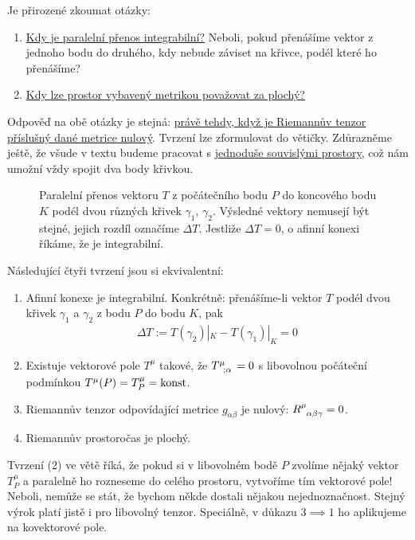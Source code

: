 \documentclass{article}
\begin{document}
Je přirozené zkoumat otázky:
\begin{enumerate}
    \item \underline{Kdy je paralelní přenos integrabilní?} Neboli, pokud přenášíme vektor z jednoho bodu do druhého, kdy nebude záviset na křivce, podél které ho přenášíme?
    \item \underline{Kdy lze prostor vybavený metrikou považovat za plochý?}
\end{enumerate}

Odpověď na obě otázky je stejná: \underline{právě tehdy, když je Riemannův tenzor příslušný dané metrice nulový}. Tvrzení lze zformulovat do větičky. Zdůrazněme ještě, že všude v textu budeme pracovat s \underline{jednoduše souvislými prostory}, což nám umožní vždy spojit dva body křivkou.

\begin{figure}[H] 

\centering
\def\svgwidth{9cm}

\caption{Paralelní přenos vektoru $T$ z počátečního bodu $P$ do koncového bodu $K$ podél dvou různých křivek $\gamma_1$, $\gamma_2$. Výsledné vektory nemusejí být stejné, jejich rozdíl označíme $\Delta T$. Jestliže $\Delta T = 0$, o afinní konexi říkáme, že je integrabilní.}
\label{fig:}

\end{figure}

\begin{theorem}
    Následující čtyři tvrzení jsou si ekvivalentní:
    \begin{enumerate}
        \item Afinní konexe je integrabilní. Konkrétně: přenášíme-li vektor $T$ podél dvou křivek $\gamma_1$ a $\gamma_2$ z bodu $P$ do bodu $K$, pak
        \begin{align}
            \Delta T := T(\gamma_2)|_K - T(\gamma_1)|_K = 0
        \end{align}
        \item Existuje vektorové pole $T^\mu$ takové, že $T\indices{^\mu_;_\alpha} = 0$ s libovolnou počáteční podmínkou $T^\mu(P) = T_P^\mu = \mathrm{konst}$. 
        \item Riemannův tenzor odpovídající metrice $g_{\alpha \beta}$ je nulový: $R\indices{^\mu_\alpha_\beta_\gamma} = 0$.
        \item Riemannův prostoročas je plochý.
    \end{enumerate}
\end{theorem}

Tvrzení (2) ve větě říká, že pokud si v libovolném bodě $P$ zvolíme nějaký vektor $T_P^\mu$ a paralelně ho rozneseme do celého prostoru, vytvoříme tím vektorové pole! Neboli, nemůže se stát, že bychom někde dostali nějakou nejednoznačnost. Stejný výrok platí jistě i pro libovolný tenzor. Speciálně, v důkazu $3 \implies 1$ ho aplikujeme na kovektorové pole.
\end{document}
